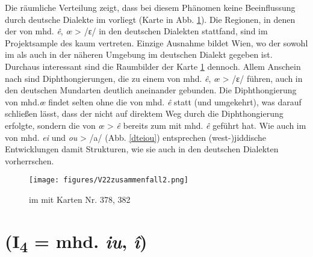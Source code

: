  
 Die räumliche Verteilung zeigt, dass bei diesem Phänomen keine Beeinflussung durch deutsche Dialekte im  vorliegt (Karte in Abb. \ref{karteV22}). Die Regionen, in denen der  von mhd. \textit{ê}, \textit{œ} > /ɛ\textsubarch{\textsci}/ in den deutschen Dialekten stattfand, sind im Projektsample des  kaum vertreten. Einzige Ausnahme bildet Wien, wo der  sowohl im  als auch in der näheren Umgebung im deutschen Dialekt gegeben ist. Durchaus interessant sind die Raumbilder der Karte \ref{karteV22} dennoch. Allem Anschein nach sind Diphthongierungen, die zu einem  von mhd. \textit{ê}, \textit{œ} > /ɛ\textsubarch{\textsci}/ führen, auch in den deutschen Mundarten deutlich aneinander gebunden. Die Diphthongierung von mhd.\textit{œ} findet selten ohne die von mhd. \textit{ê} statt (und umgekehrt), was darauf schließen lässt, dass der  nicht auf direktem Weg durch die Diphthongierung erfolgte, sondern die  von \textit{œ} > \textit{ê}  bereits zum  mit mhd. \textit{ê} geführt hat. Wie auch im  von mhd. \textit{ei} und \textit{ou} > /a\textlengthmark/ (Abb. \ref{dteiou}) entsprechen (west-)jiddische Entwicklungen damit Strukturen, wie sie auch in den deutschen Dialekten vorherrschen. \\ 
 
 
  \begin{figure}[h!]
		\centering
\texttt{[image: figures/V22zusammenfall2.png]}
		\caption{\label{karteV22}   im  mit  Karten Nr. 378, 382}
		\end{figure}
\FloatBarrier
 



 
 
 \section{ (I\textsubscript{4} = mhd. \textit{iu}, \textit{î})}\label{phonV35}

